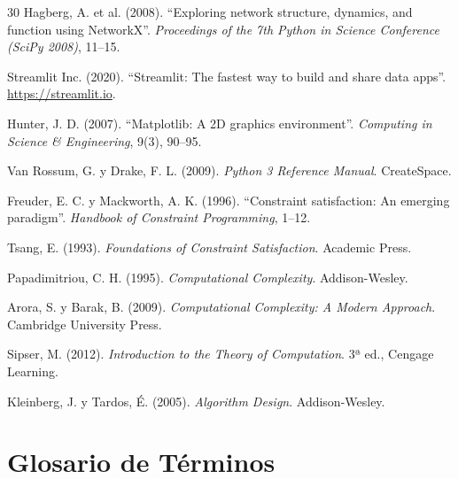 \documentclass[12pt,a4paper]{article}
\begin{document}
\begin{thebibliography}{30}
Hagberg, A. et al. (2008). ``Exploring network structure, dynamics, and function using NetworkX''. \textit{Proceedings of the 7th Python in Science Conference (SciPy 2008)}, 11--15.

Streamlit Inc. (2020). ``Streamlit: The fastest way to build and share data apps''. \url{https://streamlit.io}.

Hunter, J. D. (2007). ``Matplotlib: A 2D graphics environment''. \textit{Computing in Science \& Engineering}, 9(3), 90--95.

Van Rossum, G. y Drake, F. L. (2009). \textit{Python 3 Reference Manual}. CreateSpace.

Freuder, E. C. y Mackworth, A. K. (1996). ``Constraint satisfaction: An emerging paradigm''. \textit{Handbook of Constraint Programming}, 1--12.

Tsang, E. (1993). \textit{Foundations of Constraint Satisfaction}. Academic Press.

Papadimitriou, C. H. (1995). \textit{Computational Complexity}. Addison-Wesley.

Arora, S. y Barak, B. (2009). \textit{Computational Complexity: A Modern Approach}. Cambridge University Press.

Sipser, M. (2012). \textit{Introduction to the Theory of Computation}. 3ª ed., Cengage Learning.

Kleinberg, J. y Tardos, É. (2005). \textit{Algorithm Design}. Addison-Wesley.

\end{thebibliography}

\newpage
\appendix
\section{Glosario de Términos}
\end{document}
